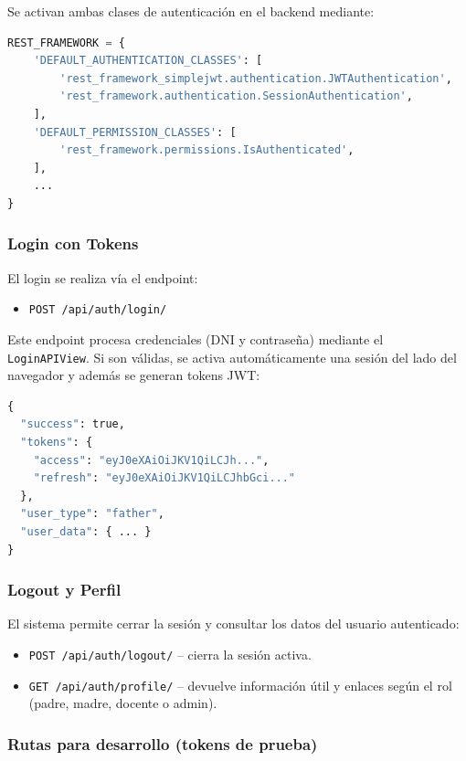 \documentclass{article}
\begin{document}
Se activan ambas clases de autenticación en el backend mediante:

\begin{lstlisting}[language=Python, caption={Configuración de autenticación en settings.py}]
REST_FRAMEWORK = {
    'DEFAULT_AUTHENTICATION_CLASSES': [
        'rest_framework_simplejwt.authentication.JWTAuthentication',
        'rest_framework.authentication.SessionAuthentication',
    ],
    'DEFAULT_PERMISSION_CLASSES': [
        'rest_framework.permissions.IsAuthenticated',
    ],
    ...
}
\end{lstlisting}

\subsubsection*{Login con Tokens}

El login se realiza vía el endpoint:

\begin{itemize}
  \item \texttt{POST /api/auth/login/}
\end{itemize}

Este endpoint procesa credenciales (DNI y contraseña) mediante el \texttt{LoginAPIView}. Si son válidas, se activa automáticamente una sesión del lado del navegador y además se generan tokens JWT:

\begin{lstlisting}[language=Python, caption={Respuesta JSON al hacer login}]
{
  "success": true,
  "tokens": {
    "access": "eyJ0eXAiOiJKV1QiLCJh...",
    "refresh": "eyJ0eXAiOiJKV1QiLCJhbGci..."
  },
  "user_type": "father",
  "user_data": { ... }
}
\end{lstlisting}

\subsubsection*{Logout y Perfil}

El sistema permite cerrar la sesión y consultar los datos del usuario autenticado:

\begin{itemize}
  \item \texttt{POST /api/auth/logout/} – cierra la sesión activa.
  \item \texttt{GET /api/auth/profile/} – devuelve información útil y enlaces según el rol (padre, madre, docente o admin).
\end{itemize}

\subsubsection*{Rutas para desarrollo (tokens de prueba)}
\end{document}
